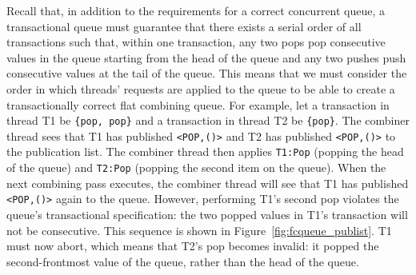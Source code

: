 Recall that, in addition to the requirements for a correct concurrent queue, a transactional queue must guarantee that there exists a serial order of all transactions such that, within one transaction, any two pops pop consecutive values in the queue starting from the head of the queue and any two pushes push consecutive values at the tail of the queue.
This means that we must consider the order in which threads' requests are applied to the queue to be able to create a transactionally correct flat combining queue. For example, let a transaction in thread T1 be \texttt{\{pop, pop\}} and a transaction in thread T2 be \texttt{\{pop\}}. The combiner thread sees that T1 has published \texttt{<POP,()>} and T2 has published \texttt{<POP,()>} to the publication list. The combiner thread then applies \texttt{T1:Pop} (popping the head of the queue) and \texttt{T2:Pop} (popping the second item on the queue). When the next combining pass executes, the combiner thread will see that T1 has published \texttt{<POP,()>} again to the queue. However, performing T1's second pop violates the queue's transactional specification: the two popped values in T1's transaction will not be consecutive. This sequence is shown in Figure~\ref{fig:fcqueue_publist}. T1 must now abort, which means that T2's pop becomes invalid: it popped the second-frontmost value of the queue, rather than the head of the queue.

